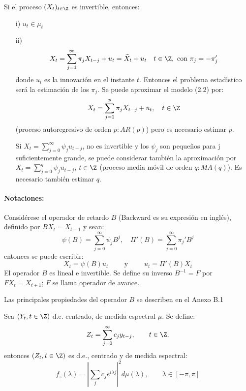 \begin{observacion}
Si el proceso $(X_{t} )_{t\in \Z} $ es invertible, entonces:
\begin{enumerate}
 \item[i)] $u_{t} \in \mu_{t} $ 
 \item[ii)] \begin{equation}
        X_{t} =\sum_{j=1}^\infty {\pi_{j} X_{t-j} } +u_{t} =\widehat{X}_{t} +u_{t} \quad t\in \Z,\text{ con }\pi_{j} =-\pi_{j}'     
       \end{equation}
	donde $u_{t} $ es la innovaci\'{o}n en el instante $t$. Entonces el problema estad\'{\i}stico ser\'{a} la estimaci\'{o}n de los $\pi_{j} $. Se puede aproximar el modelo (2.2) por:
	\[
	 X_{t} =\sum_{j=1}^p \pi_{j} X_{t-j} +u_{t} ,\quad t\in \Z
	\]
	(proceso autoregresivo de orden $p: AR(p)$) pero es necesario estimar $p$.

Si $\displaystyle X_{t} =\sum_{j=0}^\infty {\psi_{j} u_{t-j} } $, no es invertible y los $\psi_{j}$ son peque\~{n}os para j suficientemente grande, se puede considerar tambi\'{e}n la aproximaci\'{o}n por $\displaystyle X_{t} =\sum_{j=0}^q {\psi_{j} u_{t-j} }$, $t\in \Z$ (proceso media m\'{o}vil de orden $q: MA(q)$). Es necesario tambi\'{e}n estimar $q$.
\end{enumerate}
\end{observacion}


\paragraph{Notaciones:} Consid\'{e}rese el operador de retardo $B$ (Backward es su expresi\'{o}n en ingl\'{e}s), definido por $BX_{t} =X_{t-1} $ y sean:
\[
\psi \left( B \right)=\sum_{j=0}^\infty {\psi_{j} B^{j}} ,
\quad
\Pi'\left( B \right)=\sum_{j=0}^\infty {\pi_{j}' } B^{j}
\]
entonces se puede escribir:
\[
 X_{t} =\psi \left( B \right)u_{t}\qquad\text{ y }\qquad u_{t} =\Pi'\left( B \right)X_{t}
\]
El operador $B$ es lineal e invertible. Se define su inverso $B^{-1}=F$ por $FX_{t} =X_{t+1} $; $F$ se llama operador de avance.\newline

Las principales propiedades del operador $B$ se describen en el Anexo B.1

\begin{teorema}
 Sea $\left( {Y_{t} ,t\in \Z} \right)$ d.e. centrado, de medida espectral $\mu $. Se define:
\[
Z_{t} =\sum_{j=0}^\infty {c_{j} y_{t-j} } ,\qquad t\in \Z,
\]
entonces $\left( {Z_{t} ,t\in \Z} \right)$ es d.e., centrado y de medida espectral:
\[
f_{z} \left( \lambda \right)=\left| {\sum_j {c_{j} e^{i\lambda j}} } \right|^{2}d\mu \left( \lambda \right),\qquad \lambda \in \left[ {-\pi ,\pi } \right]
\]
\end{teorema}

